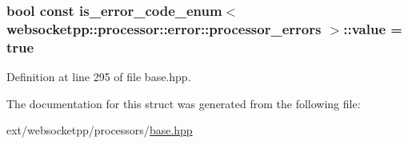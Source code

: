 \subsubsection[{value}]{\setlength{\rightskip}{0pt plus 5cm}bool const is\+\_\+error\+\_\+code\+\_\+enum$<$ {\bf websocketpp\+::processor\+::error\+::processor\+\_\+errors} $>$\+::value = true\hspace{0.3cm}{\ttfamily [static]}}\label{structis__error__code__enum_3_01websocketpp_1_1processor_1_1error_1_1processor__errors_01_4_a981549f083d0fb7c2c7afa8184e59056}


Definition at line 295 of file base.\+hpp.



The documentation for this struct was generated from the following file\+:\begin{DoxyCompactItemize}
\item 
ext/websocketpp/processors/\hyperlink{processors_2base_8hpp}{base.\+hpp}\end{DoxyCompactItemize}
